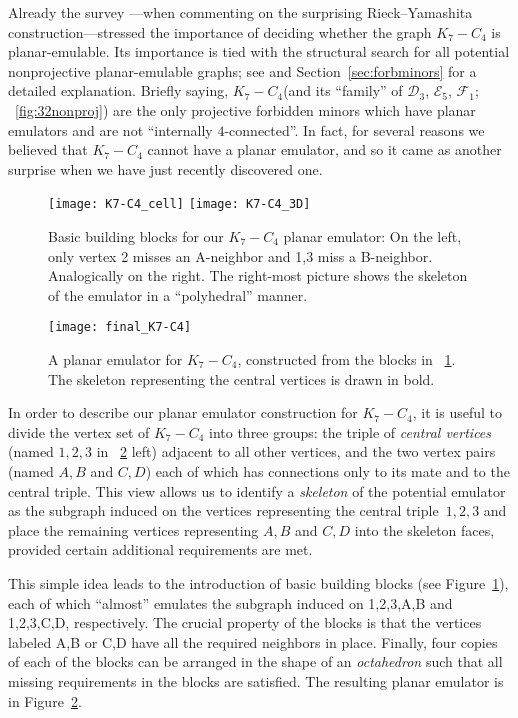 \documentclass[envcountsect,envcountsame]{llncs}
\newcommand{\KK}{\ensuremath{{K}_7 - C_4}\xspace}
\newcommand{\DD}{\ensuremath{\mathcal{D}_3}\xspace}
\newcommand{\EEE}{\ensuremath{\mathcal{E}_5}\xspace}
\newcommand{\FF}{\ensuremath{\mathcal{F}_1}\xspace}
\begin{document}
Already the survey \cite{cit:20years}---when commenting on the surprising
Rieck--Yamashita construction---stressed the importance of deciding
whether the graph \KK is planar-emulable.
Its importance is tied with the structural search for all potential
nonprojective planar-emulable graphs;
see \cite{cit:counterex,cit:martinbc} and Section~\ref{sec:forbminors} for
a detailed explanation.
Briefly saying, \KK (and its ``family'' of \DD, \EEE, \FF;
\figurename~\ref{fig:32nonproj}) are the only projective forbidden minors 
which have planar emulators and are not ``internally $4$-connected''.
In fact, for several reasons we believed that \KK cannot have a planar emulator,
and so it came as another surprise when we have just recently discovered
one.

\begin{figure}[tb] \centering
\vspace{-3mm}
\texttt{[image: K7-C4\_cell]}
 \qquad\qquad
\texttt{[image: K7-C4\_3D]}
\caption{Basic building blocks for our \KK planar emulator:
	On the left, only vertex 2 misses an A-neighbor and 1,3 miss a  B-neighbor.
	Analogically on the right. The right-most picture shows the skeleton of the emulator in 
	a ``polyhedral'' manner.}
\label{fig:K7-C4_cells}
\end{figure}

\begin{figure}[tb]\centering
\texttt{[image: final\_K7-C4]}
\caption{A planar emulator for \KK, constructed from the blocks in
	\figurename~\ref{fig:K7-C4_cells}.
	The skeleton representing the central vertices is drawn in bold.}
\label{fig:K7-C4_final}
\end{figure}

In order to describe our planar emulator construction for  \KK,
it is useful to divide the vertex set of \KK into three groups:
the triple of \emph{central vertices} (named
$1,2,3$ in \figurename~\ref{fig:K7-C4_final} left) adjacent to all 
other vertices, and the two vertex pairs (named $A,B$ and $C,D$)
each of which has connections only to its mate and to the central triple.
This view allows us to identify a \emph{skeleton} of the potential emulator
as the subgraph induced on the vertices representing the central
triple~$1,2,3$ and place the remaining vertices representing $A,B$ and
$C,D$ into the skeleton faces, provided certain additional requirements are
met.

This simple idea leads to the introduction of basic building blocks (see
Figure~\ref{fig:K7-C4_cells}), each of which 
``almost'' emulates the subgraph induced on 1,2,3,A,B and 1,2,3,C,D, respectively.
The crucial property of the blocks is that the vertices labeled A,B or C,D have
all the required neighbors in place.
Finally, four copies of each of the blocks can be arranged in the shape of
an \emph{octahedron} such that all missing requirements in the blocks are
satisfied.
The resulting planar emulator is in Figure~\ref{fig:K7-C4_final}.
\end{document}
